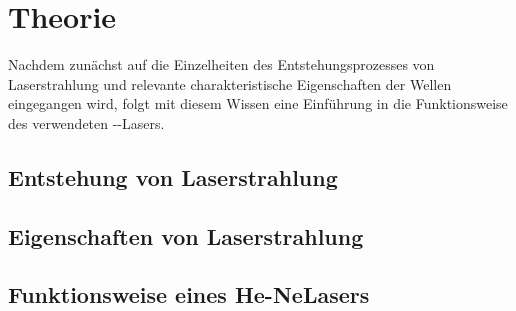 \section{Theorie}\label{sec:theorie}
Nachdem zunächst auf die Einzelheiten des Entstehungsprozesses von Laserstrahlung und relevante charakteristische Eigenschaften der Wellen eingegangen wird, folgt mit diesem Wissen eine Einführung in die Funktionsweise des verwendeten --Lasers.
\subsection{Entstehung von Laserstrahlung}
\subsection{Eigenschaften von Laserstrahlung}
\subsection{Funktionsweise eines He-NeLasers}